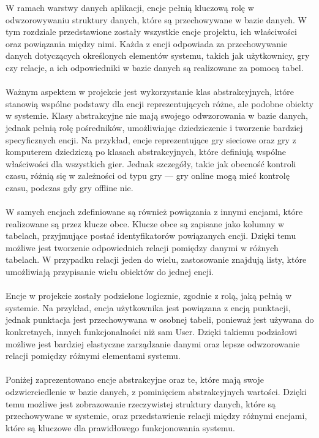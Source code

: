 \documentclass[12pt,a4paper]{article}
\begin{document}
W ramach warstwy danych aplikacji, encje pełnią kluczową rolę w odwzorowywaniu struktury danych, które są przechowywane w bazie danych. W tym rozdziale przedstawione zostały wszystkie encje projektu, ich właściwości oraz powiązania między nimi. Każda z encji odpowiada za przechowywanie danych dotyczących określonych elementów systemu, takich jak użytkownicy, gry czy relacje, a ich odpowiedniki w bazie danych są realizowane za pomocą tabel.
\\\\
Ważnym aspektem w projekcie jest wykorzystanie klas abstrakcyjnych, które stanowią wspólne podstawy dla encji reprezentujących różne, ale podobne obiekty w systemie. Klasy abstrakcyjne nie mają swojego odwzorowania w bazie danych, jednak pełnią rolę pośredników, umożliwiając dziedziczenie i tworzenie bardziej specyficznych encji. Na przykład, encje reprezentujące gry sieciowe oraz gry z komputerem dziedziczą po klasach abstrakcyjnych, które definiują wspólne właściwości dla wszystkich gier. Jednak szczegóły, takie jak obecność kontroli czasu, różnią się w zależności od typu gry — gry online mogą mieć kontrolę czasu, podczas gdy gry offline nie.
\\\\
W samych encjach zdefiniowane są również powiązania z innymi encjami, które realizowane są przez klucze obce. Klucze obce są zapisane jako kolumny w tabelach, przyjmujące postać identyfikatorów powiązanych encji. Dzięki temu możliwe jest tworzenie odpowiednich relacji pomiędzy danymi w różnych tabelach. W przypadku relacji jeden do wielu, zastosowanie znajdują listy, które umożliwiają przypisanie wielu obiektów do jednej encji.
\\\\
Encje w projekcie zostały podzielone logicznie, zgodnie z rolą, jaką pełnią w systemie. Na przykład, encja użytkownika jest powiązana z encją punktacji, jednak punktacja jest przechowywana w osobnej tabeli, ponieważ jest używana do konkretnych, innych funkcjonalności niż sam User. Dzięki takiemu podziałowi możliwe jest bardziej elastyczne zarządzanie danymi oraz lepsze odwzorowanie relacji pomiędzy różnymi elementami systemu.
\\\\
Poniżej zaprezentowano encje abstrakcyjne oraz te, które mają swoje odzwierciedlenie w bazie danych, z pominięciem abstrakcyjnych wartości. Dzięki temu możliwe jest zobrazowanie rzeczywistej struktury danych, które są przechowywane w systemie, oraz przedstawienie relacji między różnymi encjami, które są kluczowe dla prawidłowego funkcjonowania systemu.
\end{document}
